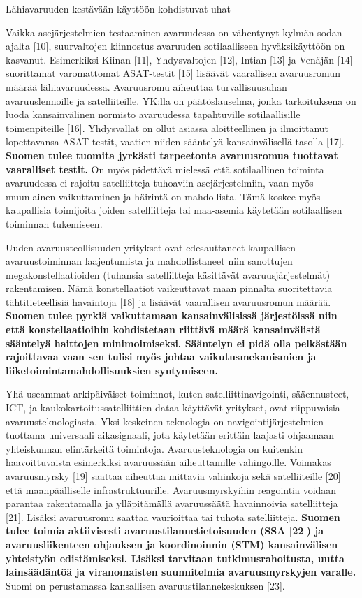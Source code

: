 \protect\hypertarget{anchor-4}{}{}Lähiavaruuden kestävään käyttöön
kohdistuvat uhat

Vaikka asejärjestelmien testaaminen avaruudessa on vähentynyt kylmän
sodan ajalta {[}10{]}, suurvaltojen kiinnostus avaruuden sotilaalliseen
hyväksikäyttöön on kasvanut. Esimerkiksi Kiinan {[}11{]}, Yhdysvaltojen
{[}12{]}, Intian {[}13{]} ja Venäjän {[}14{]} suorittamat varomattomat
ASAT-testit {[}15{]} lisäävät vaarallisen avaruusromun määrää
lähiavaruudessa. Avaruusromu aiheuttaa turvallisuusuhan avaruuslennoille
ja satelliiteille. YK:lla on päätöslauselma, jonka tarkoituksena on
luoda kansainvälinen normisto avaruudessa tapahtuville sotilaallisille
toimenpiteille {[}16{]}. Yhdysvallat on ollut asiassa aloitteellinen ja
ilmoittanut lopettavansa ASAT-testit, vaatien niiden sääntelyä
kansainvälisellä tasolla {[}17{]}. \textbf{Suomen tulee tuomita jyrkästi
tarpeetonta avaruusromua tuottavat vaaralliset testit. }On myös
pidettävä mielessä että sotilaallinen toiminta avaruudessa ei rajoitu
satelliitteja tuhoaviin asejärjestelmiin, vaan myös muunlainen
vaikuttaminen ja häirintä on mahdollista. Tämä koskee myös kaupallisia
toimijoita joiden satelliitteja tai maa-asemia käytetään sotilaallisen
toiminnan tukemiseen.

Uuden avaruusteollisuuden yritykset ovat edesauttaneet kaupallisen
avaruustoiminnan laajentumista ja mahdollistaneet niin sanottujen
megakonstellaatioiden (tuhansia satelliitteja käsittävät
avaruusjärjestelmät) rakentamisen. Nämä konstellaatiot vaikeuttavat maan
pinnalta suoritettavia tähtitieteellisiä havaintoja {[}18{]} ja lisäävät
vaarallisen avaruusromun määrää. \textbf{Suomen tulee pyrkiä
vaikuttamaan kansainvälisissä järjestöissä niin että konstellaatioihin
kohdistetaan riittävä määrä kansainvälistä sääntelyä haittojen
minimoimiseksi. Sääntelyn ei pidä olla pelkästään rajoittavaa vaan sen
tulisi myös johtaa vaikutusmekanismien ja liiketoimintamahdollisuuksien
syntymiseen. }

Yhä useammat arkipäiväiset toiminnot, kuten satelliittinavigointi,
sääennusteet, ICT, ja kaukokartoitussatelliittien dataa käyttävät
yritykset, ovat riippuvaisia avaruusteknologiasta. Yksi keskeinen
teknologia on navigointijärjestelmien tuottama universaali aikasignaali,
jota käytetään erittäin laajasti ohjaamaan yhteiskunnan elintärkeitä
toimintoja. Avaruusteknologia on kuitenkin haavoittuvaista esimerkiksi
avaruussään aiheuttamille vahingoille. Voimakas avaruusmyrsky {[}19{]}
saattaa aiheuttaa mittavia vahinkoja sekä satelliiteille {[}20{]} että
maanpäälliselle infrastruktuurille. Avaruusmyrskyihin reagointia voidaan
parantaa rakentamalla ja ylläpitämällä avaruussäätä havainnoivia
satelliitteja {[}21{]}. Lisäksi avaruusromu saattaa vaurioittaa tai
tuhota satelliitteja. \textbf{Suomen tulee toimia aktiivisesti
avaruustilannetietoisuuden (SSA {[}22{]}) ja avaruusliikenteen ohjauksen
ja koordinoinnin (STM) kansainvälisen yhteistyön edistämiseksi. Lisäksi
tarvitaan tutkimusrahoitusta, uutta lainsäädäntöä ja viranomaisten
suunnitelmia avaruusmyrskyjen varalle.} Suomi on perustamassa
kansallisen avaruustilannekeskuksen {[}23{]}.

